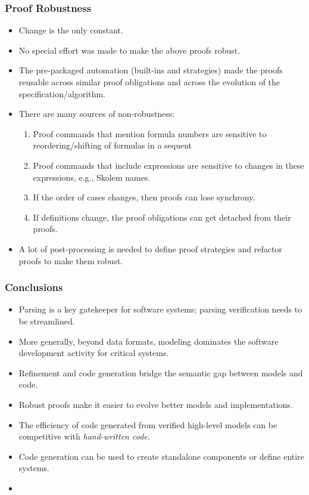 \documentclass[xcolor=dvipsnames]{beamer}
\begin{document}
\begin{frame}[fragile]
\frametitle{Proof Robustness}
\begin{itemize}
\item Change is the only constant.
\item No special effort was made to make the above proofs robust.
\item The pre-packaged automation (built-ins and strategies) made the proofs reusable across similar proof obligations and across the evolution of the specification/algorithm.
\item There are many sources of non-robustness:
\begin{enumerate}
\item Proof commands that mention formula numbers are sensitive to  reordering/shifting of formulas in a sequent
\item Proof commands that include expressions are sensitive to changes in these expressions, e.g., Skolem names.
\item If the order of cases changes, then proofs can lose synchrony.
  \item If definitions change, the proof obligations can get detached from their proofs. 
  \end{enumerate}
\item   A lot of post-processing is needed to define proof strategies and refactor proofs to make them robust.
\end{itemize}
\end{frame}


\begin{frame}[fragile]
\frametitle{Conclusions}
\begin{itemize}
\item   Parsing is a key gatekeeper for software systems; parsing verification needs to be streamlined.
\item   More generally, beyond data formats, modeling dominates the software development activity for critical systems.
\item   Refinement and code generation bridge the semantic gap between models and code.
\item   Robust proofs make it easier to evolve better models and implementations. 
\item   The efficiency of code generated from verified high-level models can be competitive with \emph{hand-written code}.
\item Code generation can be used to create standalone components or define entire systems.
\item {}
\end{itemize}
\end{frame}
\end{document}
